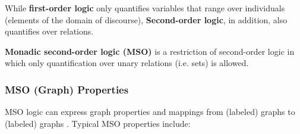 \documentclass[a4paper, 12pt, bibliography=totoc]{scrartcl}
\begin{document}
While \textbf{first-order logic} only quantifies variables that range over individuals (elements of the domain of discourse),
\textbf{Second-order logic}, in addition, also quantifies over relations.

\textbf{Monadic second-order logic (MSO)} is a restriction of second-order logic in which only quantification over unary relations (i.e. sets) is allowed. 


%


\subsubsection{MSO (Graph) Properties}
MSO logic can express graph properties and mappings from (labeled) graphs to (labeled) graphs \cite{CourcelleGROW}.
Typical MSO properties include:
\end{document}
